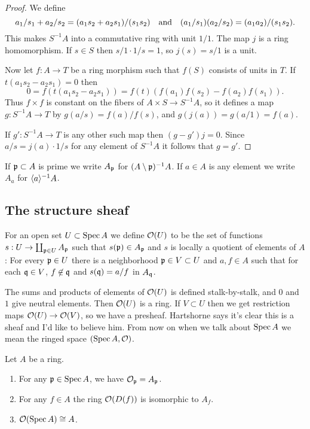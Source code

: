 \begin{proof}
We define
\[
a_1/s_1 + a_2/s_2
= (a_1 s_2 + a_2 s_1) / (s_1 s_2)
\quad\text{and}\quad
(a_1/s_1) (a_2/s_2) = (a_1a_2)/(s_1s_2).
\]
This makes $S^{-1}A$ into a commutative ring with unit $1/1$.
The map $j$ is a ring homomorphism.
If $s \in S$ then $s/1 \cdot 1/s = 1$, so $j(s) = s/1$ is a unit.

Now let $f : A \to T$ be a ring morphism such that $f(S)$ consists of units in $T$.
If $t(a_1 s_2 - a_2 s_1) = 0$ then
\[
0 = f(t(a_1 s_2 - a_2 s_1))
= f(t)(f(a_1) f(s_2) - f(a_2) f(s_1)).
\]
Thus $f \times f$ is constant on the fibers of $A \times S \to S^{-1}A$, so it defines a map $g : S^{-1}A \to T$ by $g(a/s) = f(a) / f(s)$, and $g(j(a)) = g(a/1) = f(a)$.

If $g' : S^{-1}A \to T$ is any other such map then $(g - g')j = 0$.
Since $a/s = j(a) \cdot 1/s$ for any element of $S^{-1}A$ it follows that $g = g'$.
\end{proof}

If $\mathfrak{p} \subset A$ is prime we write $A_{\mathfrak{p}}$ for $(A \setminus \mathfrak{p})^{-1}A$.
If $a \in A$ is any element we write $A_a$ for $\langle a \rangle^{-1}A$.




\subsection*{The structure sheaf}


For an open set $U \subset \operatorname{Spec} A$ we define \(\mathcal{O}(U)\) to be the set of functions $s : U \to \coprod_{\mathfrak{p} \in U} A_{\mathfrak{p}}$ such that $s(\mathfrak{p}) \in A_{\mathfrak{p}}$ and $s$ is locally a quotient of elements of $A$:
For every $\mathfrak{p} \in U$ there is a neighborhood $\mathfrak{p} \in V \subset U$ and $a,f \in A$ such that for each $\mathfrak{q} \in V$, $f \not\in \mathfrak{q}$ and $s(\mathfrak{q}) = a/f$ in $A_{\mathfrak{q}}$.

The sums and products of elements of $\mathcal{O}(U)$ is defined stalk-by-stalk, and $0$ and $1$ give neutral elements.
Then $\mathcal{O}(U)$ is a ring.
If $V \subset U$ then we get restriction maps $\mathcal{O}(U) \to \mathcal{O}(V)$, so we have a presheaf.
Hartshorne says it's clear this is a sheaf and I'd like to believe him.
From now on when we talk about $\operatorname{Spec} A$ we mean the ringed space $(\operatorname{Spec} A, \mathcal{O})$.


\begin{prop}
Let $A$ be a ring.
\begin{enumerate}
\item
For any $\mathfrak{p} \in \operatorname{Spec} A$, we have $\mathcal{O}_{\mathfrak{p}} = A_{\mathfrak{p}}$.

\item
For any $f \in A$ the ring $\mathcal{O}(D(f))$ is isomorphic to $A_{f}$.

\item
$\mathcal{O}(\operatorname{Spec} A) \cong A$.
\end{enumerate}
\end{prop}


